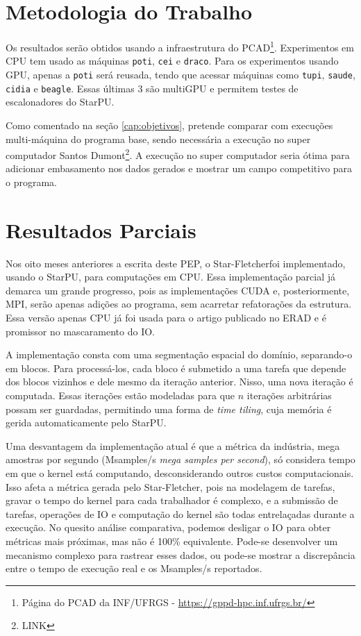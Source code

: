 \documentclass[ppgc,pep]{infufrgs}
\newcommand{\StarFletch}{Star-Fletcher}
\begin{document}
\chapter{Metodologia do Trabalho}
\label{cap:metodologia}

Os resultados serão obtidos usando a infraestrutura do PCAD\footnote{Página do PCAD da INF/UFRGS - \url{https://gppd-hpc.inf.ufrgs.br/}}. Experimentos em CPU tem usado as máquinas \texttt{poti}, \texttt{cei} e \texttt{draco}. Para os experimentos usando GPU, apenas a \texttt{poti} será reusada, tendo que acessar máquinas como \texttt{tupi}, \texttt{saude}, \texttt{cidia} e \texttt{beagle}. Essas últimas 3 são multiGPU e permitem testes de escalonadores do StarPU.

Como comentado na seção \ref{cap:objetivos}, pretende comparar com execuções multi-máquina do programa base, sendo necessária a execução no super computador Santos Dumont\footnote{LINK}. A execução no super computador seria ótima para adicionar embasamento nos dados gerados e mostrar um campo competitivo para o programa.

\chapter{Resultados Parciais}
\label{cap:resultados}

Nos oito meses anteriores a escrita deste PEP, o \StarFletch foi implementado, usando o StarPU, para computações em CPU. Essa implementação parcial já demarca um grande progresso, pois as implementações CUDA e, posteriormente, MPI, serão apenas adições ao programa, sem acarretar refatorações da estrutura. Essa versão apenas CPU já foi usada para o artigo publicado no ERAD e é promissor no mascaramento do IO. 

A implementação consta com uma segmentação espacial do domínio, separando-o em blocos. Para processá-los, cada bloco é submetido a uma tarefa que depende dos blocos vizinhos e dele mesmo da iteração anterior. Nisso, uma nova iteração é computada. Essas iterações estão modeladas para que $n$ iterações arbitrárias possam ser guardadas, permitindo uma forma de \textit{time tiling}, cuja memória é gerida automaticamente pelo StarPU. 

Uma desvantagem da implementação atual é que a métrica da indústria, mega amostras por segundo (Msamples/s \textit{mega samples per second}), só considera tempo em que o kernel está computando, desconsiderando outros custos computacionais. Isso afeta a métrica gerada pelo \StarFletch, pois na modelagem de tarefas, gravar o tempo do kernel para cada trabalhador é complexo, e a submissão de tarefas, operações de IO e computação do kernel são todas entrelaçadas durante a execução. No quesito análise comparativa, podemos desligar o IO para obter métricas mais próximas, mas não é 100\% equivalente. Pode-se desenvolver um mecanismo complexo para rastrear esses dados, ou pode-se mostrar a discrepância entre o tempo de execução real e os Msamples/s reportados. 
\end{document}
